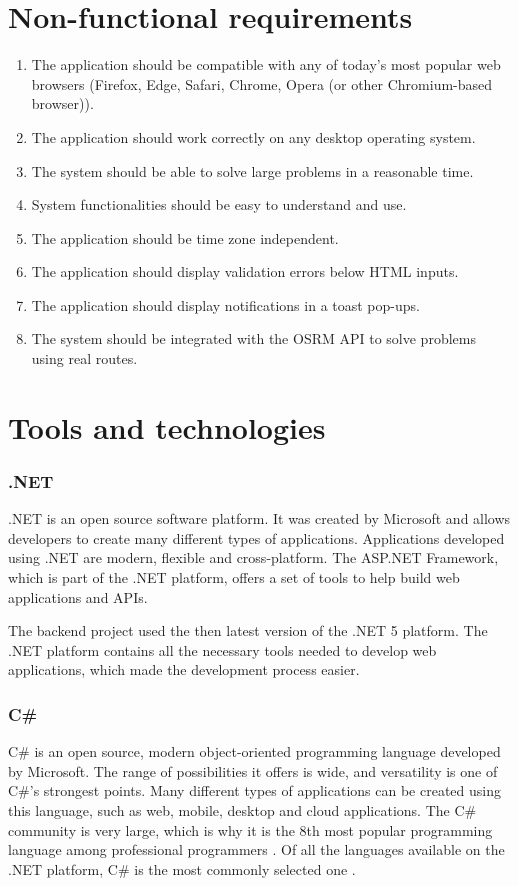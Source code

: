 \documentclass[a4paper,twoside,12pt]{book}
\begin{document}
\section{Non-functional requirements}
\begin{enumerate}
    \item The application should be compatible with any of today's most popular web browsers (Firefox, Edge, Safari, Chrome, Opera (or other Chromium-based browser)).
    \item The application should work correctly on any desktop operating system.
    \item The system should be able to solve large problems in a reasonable time.
    \item System functionalities should be easy to understand and use.
    \item The application should be time zone independent.
    \item The application should display validation errors below HTML inputs.  
    \item The application should display notifications in a toast pop-ups.
    \item The system should be integrated with the OSRM API to solve problems using real routes.
\end{enumerate}

\section{Tools and technologies}

\subsubsection{.NET}
.NET is an open source software platform. It was created by Microsoft and allows developers to create many different types of applications. Applications developed using .NET are modern, flexible and cross-platform. The ASP.NET Framework, which is part of the .NET platform, offers a set of tools to help build web applications and APIs.

The backend project used the then latest version of the .NET 5 platform. The .NET platform contains all the necessary tools needed to develop web applications, which made the development process easier.

\subsubsection{C\#}
C\# is an open source, modern object-oriented programming language developed by Microsoft. The range of possibilities it offers is wide, and versatility is one of C\#'s strongest points. Many different types of applications can be created using this language, such as web, mobile, desktop and cloud applications. The C\# community is very large, which is why it is the 8th most popular programming language among professional programmers \cite{bib:stackSurvey}. Of all the languages available on the .NET platform, C\# is the most commonly selected one \cite{bib:netSurvey}.
\end{document}
